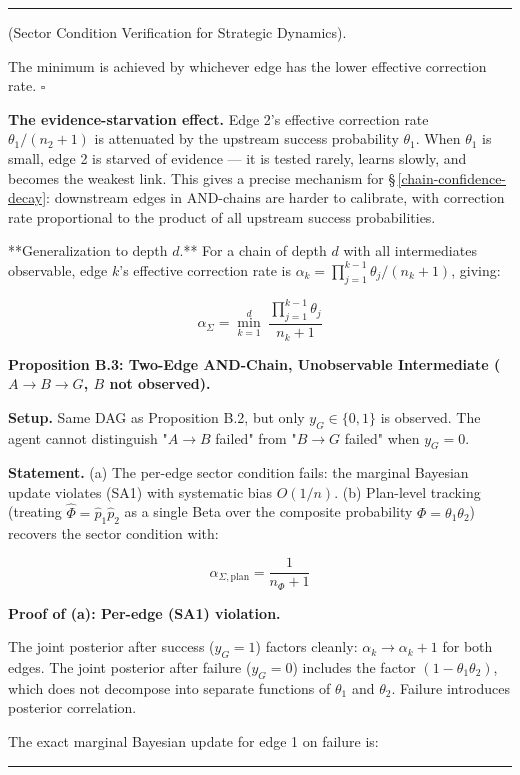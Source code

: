 \documentclass[11pt,oneside]{article}
\newcounter{claim}[section]
\renewcommand{\theclaim}{\thesection.\arabic{claim}}
\newenvironment{segment}[2]{%
  \refstepcounter{claim}%
  \bigskip\noindent\hrule\smallskip
  \noindent{\bfseries #1~\theclaim}\enskip(#2).\par\smallskip
  \noindent\ignorespaces
}{%
  \par\smallskip\noindent\hrule\bigskip
}
\newenvironment{derivation}[1][]{\begin{segment}{Derivation}{#1}}{\end{segment}}
\begin{document}
\begin{derivation}[Sector Condition Verification for Strategic Dynamics]
The minimum is achieved by whichever edge has the lower effective correction rate. $\square$

\textbf{The evidence-starvation effect.} Edge 2's effective correction rate $\theta_1/(n_2+1)$ is attenuated by the upstream success probability $\theta_1$. When $\theta_1$ is small, edge 2 is starved of evidence --- it is tested rarely, learns slowly, and becomes the weakest link. This gives a precise mechanism for \S\,\ref{chain-confidence-decay}: downstream edges in AND-chains are harder to calibrate, with correction rate proportional to the product of all upstream success probabilities.

**Generalization to depth $d$.** For a chain of depth $d$ with all intermediates observable, edge $k$'s effective correction rate is $\alpha_k = \prod_{j=1}^{k-1}\theta_j / (n_k + 1)$, giving:


$$\alpha_\Sigma = \min_{k=1}^{d}\; \frac{\prod_{j=1}^{k-1}\theta_j}{n_k+1}$$



\medskip\noindent\textbf{Proposition B.3: Two-Edge AND-Chain, Unobservable Intermediate ($A \to B \to G$, $B$ not observed).}


\textbf{Setup.} Same DAG as Proposition B.2, but only $y_G \in \{0,1\}$ is observed. The agent cannot distinguish "$A \to B$ failed" from "$B \to G$ failed" when $y_G = 0$.

\textbf{Statement.} (a) The per-edge sector condition fails: the marginal Bayesian update violates (SA1) with systematic bias $O(1/n)$. (b) Plan-level tracking (treating $\hat\Phi = \hat p_1 \hat p_2$ as a single Beta over the composite probability $\Phi = \theta_1\theta_2$) recovers the sector condition with:


$$\alpha_{\Sigma,\text{plan}} = \frac{1}{n_\Phi + 1}$$

\textbf{Proof of (a): Per-edge (SA1) violation.}

The joint posterior after success ($y_G = 1$) factors cleanly: $\alpha_k \to \alpha_k + 1$ for both edges. The joint posterior after failure ($y_G = 0$) includes the factor $(1 - \theta_1\theta_2)$, which does not decompose into separate functions of $\theta_1$ and $\theta_2$. Failure introduces posterior correlation.

The exact marginal Bayesian update for edge 1 on failure is:


\end{derivation}
\end{document}
